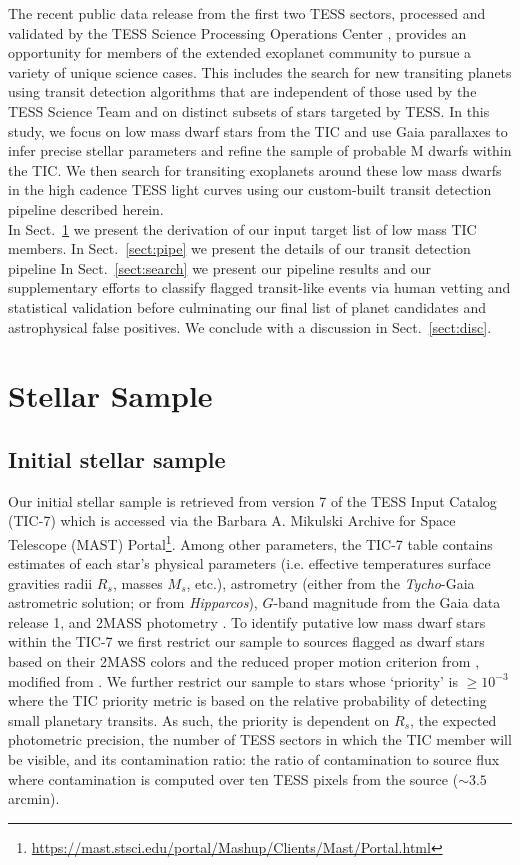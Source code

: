 The recent public data release from the first two TESS sectors, processed and validated by the
TESS Science Processing Operations Center \citep[SPOC;][]{jenkins16,twicken18,li18}, provides an opportunity
for members of the extended exoplanet community to pursue a variety of unique science cases. This
includes the search for new transiting planets using transit detection algorithms that are independent
of those used by the TESS Science Team and on distinct subsets of stars targeted by TESS.
In this study, we focus on low mass dwarf stars from the TIC and use Gaia parallaxes to infer precise
stellar parameters and refine the sample of probable M dwarfs within the TIC. We then search for transiting
exoplanets around these low mass dwarfs in the high cadence TESS light curves using our
custom-built transit detection pipeline described herein. \\

In Sect.~\ref{sect:stars} we present the derivation of our input target list of low mass TIC members.
In Sect.~\ref{sect:pipe} we present the details of our transit detection pipeline  In
Sect.~\ref{sect:search} we present our pipeline results and our supplementary efforts to
classify flagged transit-like events via human vetting and statistical validation before
culminating our final list of planet candidates and astrophysical false positives.
We conclude with a discussion in Sect.~\ref{sect:disc}.


\section{Stellar Sample} \label{sect:stars}
\subsection{Initial stellar sample}
Our initial stellar sample is retrieved from version 7 of the TESS Input Catalog (TIC-7) which
is accessed via the Barbara A. Mikulski Archive for Space Telescope (MAST)
Portal\footnote{\url{https://mast.stsci.edu/portal/Mashup/Clients/Mast/Portal.html}}. Among other
parameters, the TIC-7 table contains estimates of each star's physical parameters (i.e. effective
temperatures \teff{,} surface gravities \logg{,} radii $R_s$, masses $M_s$, etc.),
astrometry (either from the \emph{Tycho}-Gaia astrometric solution; \citealt{gaia16,brown16}
or from \emph{Hipparcos}), $G$-band magnitude from the Gaia data release 1, and 2MASS photometry
\citep{cutri03}. To identify putative low mass dwarf stars within the TIC-7 we first restrict our sample to
sources flagged as dwarf stars based on their 2MASS colors and the reduced proper motion criterion
from \cite{stassun17}, modified from \cite{collier07}. We further restrict our sample to stars whose
`priority' is $\geq 10^{-3}$ where the TIC priority metric is based on the relative probability 
of detecting small planetary transits. As such, the priority is dependent on $R_s$, the
expected photometric precision, the number of TESS sectors in which the TIC member will be visible, and its
contamination ratio: the ratio of contamination to source flux where contamination is computed over ten
TESS pixels from the source ($\sim 3.5$ arcmin). \\

